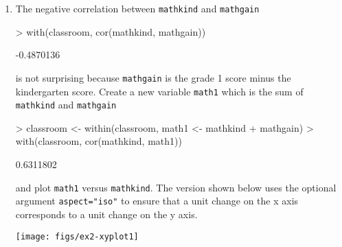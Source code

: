 \documentclass[11pt,a4rpaper]{article}
\newcommand{\code}[1]{\texttt{\small #1}}
\begin{document}
\begin{enumerate}
\item The negative correlation between \code{mathkind} and \code{mathgain} 
\begin{Schunk}
\begin{Sinput}
> with(classroom, cor(mathkind, mathgain))
\end{Sinput}
\begin{Soutput}
[1] -0.4870136
\end{Soutput}
\end{Schunk}
  is not surprising because \code{mathgain} is the grade 1 score minus
  the kindergarten score.  Create a new variable \code{math1} which is
  the sum of \code{mathkind} and \code{mathgain}
\begin{Schunk}
\begin{Sinput}
> classroom <- within(classroom, math1 <- mathkind + mathgain)
> with(classroom, cor(mathkind, math1))
\end{Sinput}
\begin{Soutput}
[1] 0.6311802
\end{Soutput}
\end{Schunk}
  and plot \code{math1} versus \code{mathkind}.  The version shown
  below uses the optional argument \code{aspect="iso"} to ensure that a
  unit change on the x axis corresponds to a unit change on the y axis.
\begin{center}
\texttt{[image: figs/ex2-xyplot1]}
\end{center}


\end{enumerate}
\end{document}
